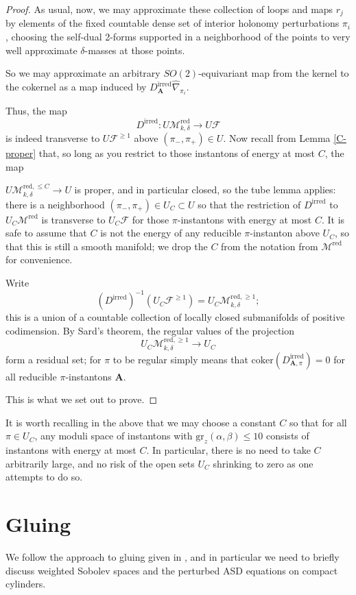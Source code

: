 \documentclass[10pt,a4paper]{amsart}
\theoremstyle{definition}
\theoremstyle{remark}
\numberwithin{figure}{qchap}
\begin{document}
\begin{proof}
As usual, now, we may approximate these collection of loops and maps $r_j$ by elements of the fixed countable dense set of interior holonomy perturbations $\pi_i$, choosing the self-dual 2-forms supported in a neighborhood of the points to very well approximate $\delta$-masses at those points.

So we may approximate an arbitrary $SO(2)$-equivariant map from the kernel to the cokernel as a map induced by $D^{\text{irred}}_{\mathbf{A}}\widehat{\nabla}_{\pi_i}$.

Thus, the map
$$D^{\text{irred}}: U \mathcal M^{\text{red}}_{k,\delta} \to U\mathcal F$$ is indeed transverse to $U \mathcal F^{\geq 1}$ above $(\pi_-, \pi_+) \in U$. Now recall from Lemma \ref{C-proper} that, so long as you restrict to those instantons of energy at most $C$, the map

$U \mathcal M^{\text{red},\leq C}_{k,\delta} \to U$ is proper, and in particular closed, so the tube lemma applies: there is a neighborhood $(\pi_-, \pi_+) \in U_C \subset U$ so that the restriction of $D^{\text{irred}}$ to $U_C\mathcal M^{\text{red}}$ is transverse to $U_C\mathcal F$ for those $\pi$-instantons with energy at most $C$. It is safe to assume that $C$ is not the energy of any reducible $\pi$-instanton above $U_C$, so that this is still a smooth manifold; we drop the $C$ from the notation from $\mathcal M^{\text{red}}$ for convenience.

Write $$(D^{\text{irred}})^{-1}(U_C\mathcal F^{\geq 1}) = U_C \mathcal M^{\text{red},\geq 1}_{k,\delta};$$ this is a union of a countable collection of locally closed submanifolds of positive codimension. By Sard's theorem, the regular values of the projection $$U_C \mathcal M^{\text{red},\geq 1}_{k,\delta} \to U_C$$ form a residual set; for $\pi$ to be regular simply means that $\text{coker}(D^{\text{irred}}_{\mathbf{A},\pi}) = 0$ for all reducible $\pi$-instantons $\mathbf{A}$.

This is what we set out to prove.
\end{proof}

It is worth recalling in the above that we may choose a constant $C$ so that for all $\pi \in U_C$, any moduli space of instantons with $\text{gr}_z(\alpha, \beta) \leq 10$ consists of instantons with energy at most $C$. In particular, there is no need to take $C$ arbitrarily large, and no risk of the open sets $U_C$ shrinking to zero as one attempts to do so. 

\section{Gluing}\label{sec:4d-gluing}
We follow the approach to gluing given in \cite[Chapter~19]{KMSW}, and in particular we need to briefly discuss weighted Sobolev spaces and the perturbed ASD equations on compact cylinders.
\end{document}
